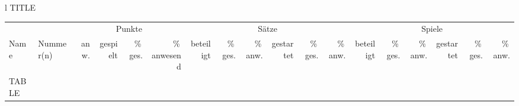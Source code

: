 \documentclass{standalone}
\newcommand\myhline{\cmidrule(r){1-2}\cmidrule(lr){3-6}\cmidrule(lr){7-12}\cmidrule(l){13-18}}
\begin{document}
   \begin{tabular}{l}
   TITLE\\
      \begin{tabular}{ ll r rrr rrr rrr rrr rrr}
\toprule
         && \multicolumn{4}{c}{Punkte} & \multicolumn{6}{c}{Sätze} & \multicolumn{6}{c}{Spiele}\\%
         Name & Nummer(n) & anw. & gespielt & \%\,ges. & \%\,anwesend & beteiligt & \%\,ges. & \%\,anw. & gestartet & \%\,ges. & \%\,anw. & beteiligt & \%\,ges. & \%\,anw. & gestartet & \%\,ges. & \%\,anw. \\\myhline
      TABLE
      \bottomrule
      \end{tabular}
   \end{tabular}
\end{document}
